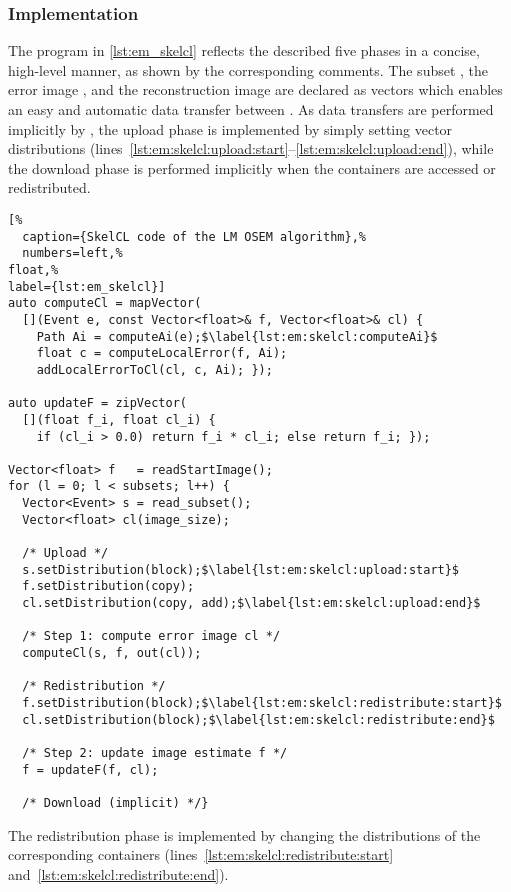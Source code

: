 \subsubsection*{\SkelCL Implementation}

The \SkelCL program in \autoref{lst:em_skelcl} reflects the described five phases in a concise, high-level manner, as shown by the corresponding comments.
The subset , the error image , and the reconstruction image  are declared as \SkelCL vectors which enables an easy and automatic data transfer between \GPUs.
As data transfers are performed implicitly by \SkelCL, the upload phase is implemented by simply setting vector distributions (lines~\ref{lst:em:skelcl:upload:start}--\ref{lst:em:skelcl:upload:end}), while the download phase is performed implicitly when the \SkelCL containers are accessed or redistributed.
\begin{lstlisting}[%
  caption={SkelCL code of the LM OSEM algorithm},%
  numbers=left,%
float,%
label={lst:em_skelcl}]
auto computeCl = mapVector(
  [](Event e, const Vector<float>& f, Vector<float>& cl) {
    Path Ai = computeAi(e);$\label{lst:em:skelcl:computeAi}$
    float c = computeLocalError(f, Ai);
    addLocalErrorToCl(cl, c, Ai); });

auto updateF = zipVector(
  [](float f_i, float cl_i) {
    if (cl_i > 0.0) return f_i * cl_i; else return f_i; });

Vector<float> f   = readStartImage();
for (l = 0; l < subsets; l++) {
  Vector<Event> s = read_subset();
  Vector<float> cl(image_size);

  /* Upload */
  s.setDistribution(block);$\label{lst:em:skelcl:upload:start}$
  f.setDistribution(copy);
  cl.setDistribution(copy, add);$\label{lst:em:skelcl:upload:end}$

  /* Step 1: compute error image cl */
  computeCl(s, f, out(cl));

  /* Redistribution */
  f.setDistribution(block);$\label{lst:em:skelcl:redistribute:start}$
  cl.setDistribution(block);$\label{lst:em:skelcl:redistribute:end}$

  /* Step 2: update image estimate f */
  f = updateF(f, cl);

  /* Download (implicit) */}
\end{lstlisting}
The redistribution phase is implemented by changing the distributions of the corresponding \SkelCL containers (lines~\ref{lst:em:skelcl:redistribute:start} and~\ref{lst:em:skelcl:redistribute:end}).

